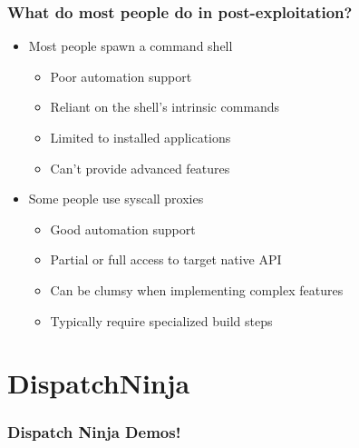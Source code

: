 \documentclass{beamer}
\newenvironment{sitemize}{\vspace{1mm}\begin{itemize}\itemsep 4pt\small}{\end{itemize}}
\begin{document}
\begin{frame}[t]
    \frametitle{What do most people do in post-exploitation?}

    \begin{sitemize}
        \item Most people spawn a command shell
        \begin{sitemize}
            \item Poor automation support
            \item Reliant on the shell's intrinsic commands
            \item Limited to installed applications
            \item Can't provide advanced features
        \end{sitemize}

        \pause
        \item Some people use syscall proxies
        \begin{sitemize}
            \item Good automation support
            \item Partial or full access to target native API
            \item Can be clumsy when implementing complex features
            \item Typically require specialized build steps
        \end{sitemize}
    \end{sitemize}
\end{frame}

%
%
%

\section{DispatchNinja}
\begin{frame}[t]
    \frametitle{Dispatch Ninja Demos!}
\end{frame}

%
%
%
\end{document}
